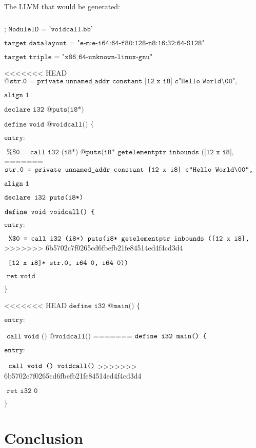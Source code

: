 \documentclass[journal=jacsat, manuscript=article]{achemso}
\begin{document}
The LLVM that would be generated:

$\texttt{}$


$\texttt{; ModuleID = 'voidcall.bb'}$

$\texttt{target datalayout = "e-m:e-i64:64-f80:128-n8:16:32:64-S128"}$

$\texttt{target triple = "x86\_64-unknown-linux-gnu"}$

<<<<<<< HEAD
$\texttt{@str.0 = private unnamed\_addr constant [12 x i8] c"Hello World\textbackslash00",}$

$\texttt{align 1}$

$\texttt{declare i32 @puts(i8*)}$

$\texttt{define void @voidcall() \{}$

$\texttt{entry:}$

$\texttt{  \%\$0 = call i32 (i8*) @puts(i8* getelementptr inbounds ([12 x i8], }$
=======
$\texttt{\@str.0 = private unnamed\_addr constant [12 x i8] c"Hello World\textbackslash00",}$


$\texttt{align 1}$

$\texttt{declare i32 \@puts(i8*)}$

$\texttt{define void \@voidcall() \{}$

$\texttt{entry:}$

$\texttt{  \%\$0 = call i32 (i8*) \@puts(i8* getelementptr inbounds ([12 x i8], }$
>>>>>>> 6b5702c7f0265cd6fbefb21fe84514ed4f4cd3d4

$\texttt{  [12 x i8]* \@str.0, i64 0, i64 0)) }$

$\texttt{  ret void}$

$\texttt{\}}$

<<<<<<< HEAD
$\texttt{define i32 @main() \{}$

$\texttt{entry:}$

$\texttt{  call void () @voidcall()}$
=======
$\texttt{define i32 \@main() \{}$

$\texttt{entry:}$

$\texttt{  call void () \@voidcall()}$
>>>>>>> 6b5702c7f0265cd6fbefb21fe84514ed4f4cd3d4

$\texttt{  ret i32 0}$

$\texttt{\}}$

\section{Conclusion}
\end{document}
